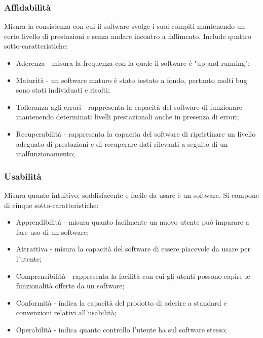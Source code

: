 \documentclass[10pt]{article}
\begin{document}
\begin{justify}
        \subsubsection{Affidabilità}
        Misura la consistenza con cui il software svolge i suoi compiti mantenendo un certo livello di prestazioni e senza andare incontro a fallimento. Include quattro sotto-caratteristiche:
        \begin{itemize}
            \item Aderenza - misura la frequenza con la quale il software è "up-and-running";
            \item Maturità - un software maturo è stato testato a fondo, pertanto molti bug sono stati individuati e risolti;
            \item Tolleranza agli errori - rappresenta la capacità del software di funzionare mantenendo determinati livelli prestazionali anche in presenza di errori;
            \item Recuperabilità - rappresenta la capacita del software di ripristinare un livello adeguato di prestazioni e di recuperare dati rilevanti a seguito di un malfunzionamento;
        \end{itemize}

        \subsubsection{Usabilità}
        Misura quanto intuitivo, soddisfacente e facile da usare è un software. Si compone di cinque sotto-caratteristiche:
        \begin{itemize}
            \item Apprendibilità - misura quanto facilmente un nuovo utente può imparare a fare uso di un software;
            \item Attrattiva - misura la capacità del software di essere piacevole da usare per l'utente;
            \item Comprensibilità - rappresenta la facilità con cui gli utenti possono capire le funzionalità offerte da un software;
            \item Conformità - indica la capacità del prodotto di aderire a standard e convenzioni relativi all'usabilità;
            \item Operabilità - indica quanto controllo l'utente ha sul software stesso;
        \end{itemize}


\end{justify}
\end{document}
